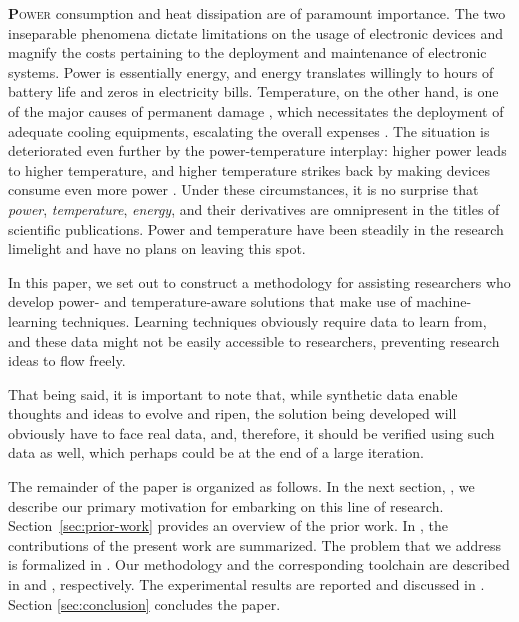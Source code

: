 \lettrine[findent=0.4em, nindent=0em]{\textbf{P}}{ower} consumption and heat
dissipation are of paramount importance. The two inseparable phenomena dictate
limitations on the usage of electronic devices and magnify the costs pertaining
to the deployment and maintenance of electronic systems. Power is essentially
energy, and energy translates willingly to hours of battery life and zeros in
electricity bills. Temperature, on the other hand, is one of the major causes of
permanent damage \cite{jedec}, which necessitates the deployment of adequate
cooling equipments, escalating the overall expenses \cite{chaudhry2015}. The
situation is deteriorated even further by the power-temperature interplay:
higher power leads to higher temperature, and higher temperature strikes back by
making devices consume even more power \cite{liu2007}. Under these
circumstances, it is no surprise that \emph{power}, \emph{temperature},
\emph{energy}, and their derivatives are omnipresent in the titles of scientific
publications. Power and temperature have been steadily in the research limelight
and have no plans on leaving this spot.

In this paper, we set out to construct a methodology for assisting researchers
who develop power- and temperature-aware solutions that make use of
machine-learning techniques. Learning techniques obviously require data to learn
from, and these data might not be easily accessible to researchers, preventing
research ideas to flow freely.

That being said, it is important to note that, while synthetic data enable
thoughts and ideas to evolve and ripen, the solution being developed will
obviously have to face real data, and, therefore, it should be verified using
such data as well, which perhaps could be at the end of a large iteration.

The remainder of the paper is organized as follows. In the next section,
, we describe our primary motivation for embarking on this line
of research. Section~\ref{sec:prior-work} provides an overview of the prior
work. In , the contributions of the present work are
summarized. The problem that we address is formalized in
. Our methodology and the corresponding toolchain are
described in  and , respectively. The
experimental results are reported and discussed in .
Section \ref{sec:conclusion} concludes the paper.
